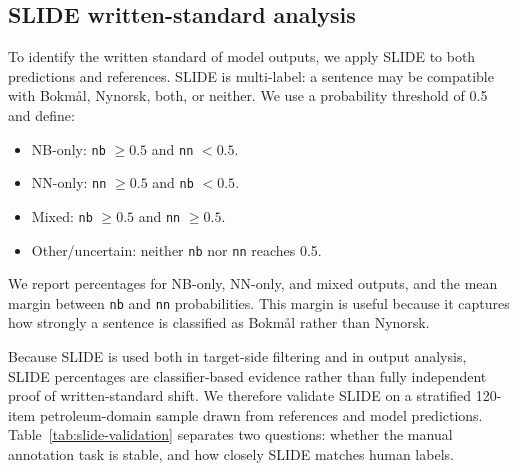\documentclass[11pt]{article}
\newcommand{\nb}{Bokm{\aa}l}
\newcommand{\nn}{Nynorsk}
\begin{document}
\subsection{SLIDE written-standard analysis}
\label{sec:slide-analysis}

To identify the written standard of model outputs, we apply SLIDE to both predictions and references. SLIDE is multi-label: a sentence may be compatible with \nb{}, \nn{}, both, or neither. We use a probability threshold of 0.5 and define:
\begin{itemize}
    \item NB-only: \texttt{nb} $\geq 0.5$ and \texttt{nn} $< 0.5$.
    \item NN-only: \texttt{nn} $\geq 0.5$ and \texttt{nb} $< 0.5$.
    \item Mixed: \texttt{nb} $\geq 0.5$ and \texttt{nn} $\geq 0.5$.
    \item Other/uncertain: neither \texttt{nb} nor \texttt{nn} reaches 0.5.
\end{itemize}

We report percentages for NB-only, NN-only, and mixed outputs, and the mean margin between \texttt{nb} and \texttt{nn} probabilities. This margin is useful because it captures how strongly a sentence is classified as \nb{} rather than \nn{}.

Because SLIDE is used both in target-side filtering and in output analysis, SLIDE percentages are classifier-based evidence rather than fully independent proof of written-standard shift. We therefore validate SLIDE on a stratified 120-item petroleum-domain sample drawn from references and model predictions. Table~\ref{tab:slide-validation} separates two questions: whether the manual annotation task is stable, and how closely SLIDE matches human labels.

\begin{table}[t]
\centering
\small
{}
\caption{Human validation of SLIDE written-standard labels on a stratified 120-item petroleum-domain sample. Exact agreement is reported as a percentage. NB Prec. is SLIDE precision for the NB-only label; NN Rec. is SLIDE recall for the NN-only label.}
\label{tab:slide-validation}
\end{table}
\end{document}
